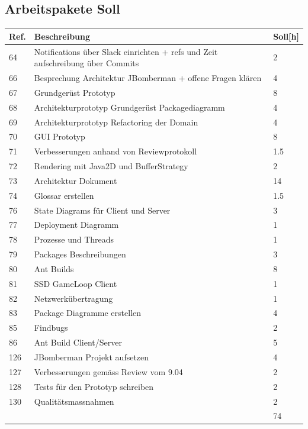 \documentclass[11pt]{scrartcl}
\begin{document}
\subsection{Arbeitspakete Soll}
  \begin{tabularx} {\linewidth}{lXl}
    \bf{Ref.}  & \bf{Beschreibung} & \bf{Soll[h]} \\
    \hline
    64 & Notifications über Slack einrichten + refs und Zeit aufschreibung über Commits & 2 \\
    66 & Besprechung Architektur JBomberman + offene Fragen klären & 4 \\
    67 &  Grundgerüst Prototyp & 8 \\
    68 & Architekturprototyp Grundgerüst Packagediagramm & 4 \\
    69 &  Architekturprototyp Refactoring der Domain & 4 \\
    70 & GUI Prototyp & 8\\
    71 & 	Verbesserungen anhand von Reviewprotokoll & 1.5\\
    72 & Rendering mit Java2D und BufferStrategy & 2 \\
    73 & Architektur Dokument & 14 \\
    74 & Glossar erstellen  & 1.5 \\
    76 & State Diagrams für Client und Server & 3 \\
    77 & Deployment Diagramm & 1\\
    78 & 	Prozesse und Threads & 1 \\
    79 & 	Packages Beschreibungen & 3 \\
    80 & Ant Builds & 8 \\
    81 & SSD GameLoop Client & 1 \\
    82 & Netzwerkübertragung & 1 \\
    83 & Package Diagramme erstellen & 4 \\
    85 & 	Findbugs & 2 \\
    86 & Ant Build Client/Server & 5 \\
    126 & JBomberman Projekt aufsetzen & 4 \\
    127 & Verbesserungen gemäss Review vom 9.04 & 2 \\
    128 & Tests für den Prototyp schreiben & 2 \\
    130 & Qualitätsmassnahmen	& 2 \\
    \hline
    & & 74
  \end{tabularx}
  
\end{document}
